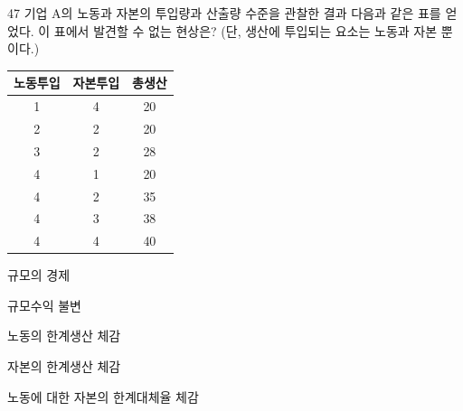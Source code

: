 \begin{question}{47}
기업 A의 노동과 자본의 투입량과 산출량 수준을 관찰한 결과 다음과 같은 표를 얻었다. 이 표에서 발견할 수 없는 현상은? (단, 생산에 투입되는 요소는 노동과 자본 뿐이다.)
\begin{center}
\renewcommand{\arraystretch}{1.1}
\begin{tabular}{|c|c|c|}\hline
노동투입 & 자본투입 & 총생산 \\ \hline
1 & 4 & 20 \\ \hline
2 & 2 & 20 \\ \hline
3 & 2 & 28 \\ \hline
4 & 1 & 20 \\ \hline
4 & 2 & 35 \\ \hline
4 & 3 & 38 \\ \hline
4 & 4 & 40 \\ \hline
\end{tabular}
\end{center}
\begin{choices}
  \item 규모의 경제
  \item 규모수익 불변
  \item 노동의 한계생산 체감
  \item 자본의 한계생산 체감
  \item 노동에 대한 자본의 한계대체율 체감
\end{choices}
\end{question}
